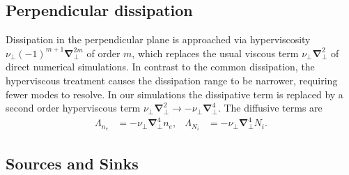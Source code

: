 \documentclass{hitec} %
\renewcommand{\vec}[1]{\boldsymbol{#1}}
\begin{document}
\subsection{Perpendicular dissipation}
Dissipation in the perpendicular plane is approached via hyperviscosity \(\nu_\perp(-1)^{m+1}\vec{\nabla}_\perp^{2m}\) of order \(m\), which replaces the usual viscous term 
\(\nu_\perp \vec{\nabla}_\perp^2\) of direct numerical simulations. In contrast to the common dissipation, the hyperviscous treatment causes the dissipation range to be narrower, 
requiring fewer modes to resolve.
In our simulations the dissipative term is replaced by a second order hyperviscous term \(\nu_\perp \vec{\nabla}_\perp^2 \rightarrow -\nu_\perp \vec{\nabla}_\perp^4 \). The diffusive terms are
\begin{align}\label{eq:perpdiffn}
 \Lambda_{n_e} &=  -\nu_\perp \vec{\nabla}_\perp^4 n_e, &
 \Lambda_{N_i} &=  -\nu_\perp \vec{\nabla}_\perp^4 N_i.
\end{align}
\subsection{Sources and Sinks}
\end{document}
